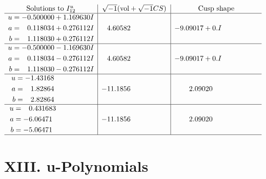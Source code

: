 \documentclass[1p]{elsarticle_modified}
\theoremstyle{definition}
\newcommand{\I}{\sqrt{-1}}
\begin{document}
$$\begin{array}{c|c|c}  
\text{Solutions to }I^u_{12}& \I (\text{vol} + \sqrt{-1}CS) & \text{Cusp shape}\\
 \hline 
\begin{aligned}
u &= -0.500000 + 1.169630 I \\
a &= \phantom{-}0.118034 + 0.276112 I \\
b &= \phantom{-}1.118030 + 0.276112 I\end{aligned}
 & \phantom{-}4.60582\phantom{ +0.000000I} & -9.09017 + 0. I\phantom{ +0.000000I} \\ \hline\begin{aligned}
u &= -0.500000 - 1.169630 I \\
a &= \phantom{-}0.118034 - 0.276112 I \\
b &= \phantom{-}1.118030 - 0.276112 I\end{aligned}
 & \phantom{-}4.60582\phantom{ +0.000000I} & -9.09017 + 0. I\phantom{ +0.000000I} \\ \hline\begin{aligned}
u &= -1.43168\phantom{ +0.000000I} \\
a &= \phantom{-}1.82864\phantom{ +0.000000I} \\
b &= \phantom{-}2.82864\phantom{ +0.000000I}\end{aligned}
 & -11.1856\phantom{ +0.000000I} & \phantom{-}2.09020\phantom{ +0.000000I} \\ \hline\begin{aligned}
u &= \phantom{-}0.431683\phantom{ +0.000000I} \\
a &= -6.06471\phantom{ +0.000000I} \\
b &= -5.06471\phantom{ +0.000000I}\end{aligned}
 & -11.1856\phantom{ +0.000000I} & \phantom{-}2.09020\phantom{ +0.000000I}\\
 \hline 
 \end{array}$$\newpage
\newpage\renewcommand{\arraystretch}{1}
\centering \section*{ XIII. u-Polynomials}
\end{document}
